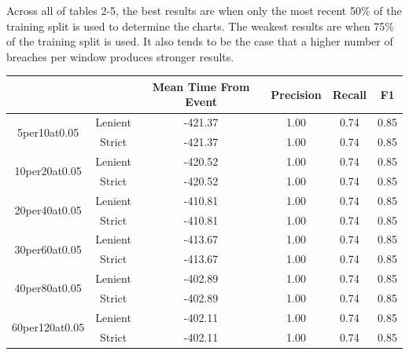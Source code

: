 \documentclass[12pt]{article}
\begin{document}
Across all of tables 2-5, the best results are when only the most recent 50\% of the training split is used to determine the
charts. The weakest results are when 75\% of the training split is used. It also tends to be the case that a higher number of
breaches per window produces stronger results.

\begin{table}[]
    \begin{tabular}{|cc|cccc|}
        \hline
                                         &         & Mean Time From Event & Precision & Recall        & F1            \\ \hline
        \multirow{2}{*}{5per10at0.05}    & Lenient & -421.37              & 1.00      & 0.74          & 0.85          \\
                                         & Strict  & -421.37              & 1.00      & 0.74          & 0.85          \\ \hline
        \multirow{2}{*}{10per20at0.05}   & Lenient & -420.52              & 1.00      & 0.74          & 0.85          \\
                                         & Strict  & -420.52              & 1.00      & 0.74          & 0.85          \\ \hline
        \multirow{2}{*}{20per40at0.05}   & Lenient & -410.81              & 1.00      & 0.74          & 0.85          \\
                                         & Strict  & -410.81              & 1.00      & 0.74          & 0.85          \\ \hline
        \multirow{2}{*}{30per60at0.05}   & Lenient & -413.67              & 1.00      & 0.74          & 0.85          \\
                                         & Strict  & -413.67              & 1.00      & 0.74          & 0.85          \\ \hline
        \multirow{2}{*}{40per80at0.05}   & Lenient & -402.89              & 1.00      & 0.74          & 0.85          \\
                                         & Strict  & -402.89              & 1.00      & 0.74          & 0.85          \\ \hline
        \multirow{2}{*}{60per120at0.05}  & Lenient & -402.11              & 1.00      & 0.74          & 0.85          \\
                                         & Strict  & -402.11              & 1.00      & 0.74          & 0.85          \\ \hline

\end{tabular}
\end{table}
\end{document}
